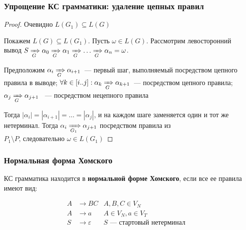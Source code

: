 \documentclass{beamer}
\newcommand{\derivegone}[1]{\xRightarrow[#1]{}}
\begin{document}
\begin{frame}[fragile]
  \transwipe[direction=90]
  \frametitle{Упрощение КС грамматики: удаление цепных правил}
  \begin{proof}
   Очевидно $L(G_1) \subseteq L(G)$

   Покажем $L(G) \subseteq L(G_1)$. Пусть $\omega \in L(G)$. Рассмотрим левосторонний вывод $S \derivegone{G} \alpha_0 \derivegone{G} \alpha_1 \derivegone{G} \dots \derivegone{G} \alpha_n = \omega$.

   Предположим $\alpha_i \derivegone{G} \alpha_{i+1}$~--- первый шаг, выполняемый посредством цепного правила в выводе; $\forall k \in [i..j]: \alpha_k \derivegone{G} \alpha_{k+1}$~--- посредством цепного правила;  $\alpha_j \derivegone{G} \alpha_{j+1}$ ~--- посредством нецепного правила

   Тогда $|\alpha_i| = |\alpha_{i+1}| = \dots = |\alpha_j|$, и на каждом шаге заменяется один и тот же нетерминал. Тогда $\alpha_i \derivegone{G_1} \alpha_{j+1} $ посредством правила из $P_1 \setminus P \text{, следовательно } \omega \in L(G_1)$
   \end{proof}

\end{frame}

\begin{frame}[fragile]
  \transwipe[direction=90]
  \frametitle{Нормальная форма Хомского}
  КС грамматика находится в \textbf{нормальной форме Хомского}, если все ее правила имеют вид:

\begin{align*}
  A &\to B C         & A, B, C \in V_N \\
  A &\to a           & A \in V_N, a \in V_T\\
  S &\to \varepsilon & S \text{ --- стартовый нетерминал}
\end{align*}

\end{frame}
\end{document}
